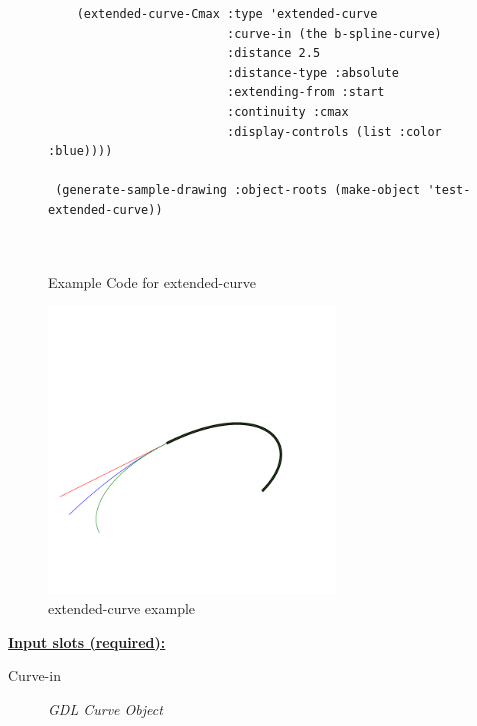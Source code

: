 \documentclass [11pt]{book}
\begin{document}
\begin{itemize}
\begin{figure}
\begin{lrbox}{\boxedverb}
\begin{minipage}{\linewidth}
{\begin{verbatim}
    (extended-curve-Cmax :type 'extended-curve
                         :curve-in (the b-spline-curve)
                         :distance 2.5
                         :distance-type :absolute
                         :extending-from :start
                         :continuity :cmax
                         :display-controls (list :color :blue))))

 (generate-sample-drawing :object-roots (make-object 'test-extended-curve))

   
\end{verbatim}}
\end{minipage}
\end{lrbox}
\fbox{\usebox{\boxedverb}}

\caption{Example Code for extended-curve}

\label{fig:example-code-extended-curve}

\end{figure}

\begin{figure}
\begin{center}
\includegraphics[width=3in,height=3in]{../images/example-extended-curve.pdf}
\end{center}

\caption{extended-curve example}

\label{fig:extended-curve}

\end{figure}





\textbf{
\underline{Input slots (required):}}

\begin{description}

\item [Curve-in]
\emph{GDL Curve Object}


\end{description}
\end{itemize}
\end{document}
